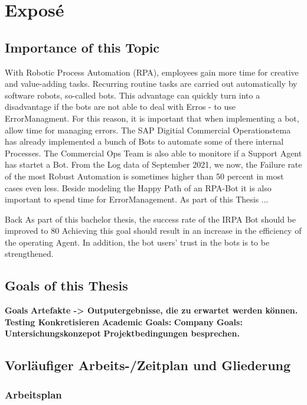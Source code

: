 \chapter{Exposé}

\section{Importance of this Topic}

With Robotic Process Automation (RPA), employees gain more time for creative and value-adding tasks. Recurring routine
tasks are carried out automatically by software robots, so-called bots. This advantage can quickly turn into a disadvantage
if the bots are not able to deal with Erros - to use ErrorManagment.
For this reason, it is important that when implementing a bot, allow time for managing errors.
The SAP Digitial Commercial Operationstema has already implemented a bunch of Bots to automate some of there internal Processes.
The Commercial Ops Team is also able to monitore if a Support Agent has startet a Bot. From the Log data of September 2021,
we now, the Failure rate of the most Robust Automation is sometimes higher than  50 percent in most cases even less.
Beside modeling the Happy Path of an RPA-Bot it is also important to spend time for ErrorManagement. As part of this Thesis ...


Back
As part of this bachelor thesis, the success rate of the IRPA Bot should be improved to 80%
Achieving this goal should result in an increase in the efficiency of the operating Agent.
In addition, the bot users' trust in the bots is to be strengthened.



\section{Goals of this Thesis}
\textbf{Goals}
\textbf{Artefakte -> Outputergebnisse, die zu erwartet werden können.}
\textbf{Testing Konkretisieren}
\textbf{Academic Goals:}
\textbf{Company Goals:}
\textbf{Untersichungskonzepot}
\textbf{Projektbedingungen besprechen.}


\newpage

\section{Vorläufiger Arbeits-/Zeitplan und Gliederung}
\subsection{Arbeitsplan}

